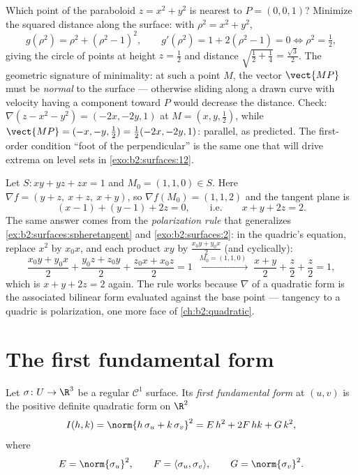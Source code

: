 \begin{example}\label{ex:b2:surfaces:closest}
Which point of the paraboloid $z = x^2 + y^2$ is nearest to
$P = (0, 0, 1)$? Minimize the squared distance along the
surface: with $\rho^2 = x^2 + y^2$,
\[
g(\rho^2) = \rho^2 + (\rho^2 - 1)^2,
\qquad
g'(\rho^2) = 1 + 2(\rho^2 - 1) = 0
\iff \rho^2 = \tfrac12 ,
\]
giving the circle of points at height $z = \frac12$ and
distance $\sqrt{\tfrac12 + \tfrac14} = \frac{\sqrt3}2$. The
geometric signature of minimality: at such a point $M$, the
vector $\vect{MP}$ must be \emph{normal} to the surface ---
otherwise sliding along a drawn curve with velocity having a
component toward $P$ would decrease the distance. Check:
$\nabla(z - x^2 - y^2) = (-2x, -2y, 1)$ at $M = (x, y,
\tfrac12)$, while $\vect{MP} = (-x, -y, \tfrac12) =
\tfrac12(-2x, -2y, 1)$: parallel, as predicted. The
first-order condition ``foot of the perpendicular'' is the
same one that will drive extrema on level sets in
\cref{exo:b2:surfaces:12}.
\end{example}

\begin{example}\label{ex:b2:surfaces:polarization}
Let $S : xy + yz + zx = 1$ and $M_0 = (1, 1, 0) \in S$. Here
$\nabla f = (y + z,\ x + z,\ x + y)$, so $\nabla f(M_0) = (1,
1, 2)$ and the tangent plane is
\[
(x - 1) + (y - 1) + 2z = 0,
\qquad\text{i.e.}\qquad x + y + 2z = 2 .
\]
The same answer comes from the \emph{polarization rule} that
generalizes \cref{ex:b2:surfaces:spheretangent} and
\cref{exo:b2:surfaces:2}: in the quadric's equation, replace
$x^2$ by $x_0x$, and each product $xy$ by $\frac{x_0y +
y_0x}2$ (and cyclically):
\[
\frac{x_0y + y_0x}2 + \frac{y_0z + z_0y}2 + \frac{z_0x +
x_0z}2 = 1
\;\xrightarrow{\ M_0 = (1,1,0)\ }\;
\frac{x + y}2 + \frac z2 + \frac z2 = 1 ,
\]
which is $x + y + 2z = 2$ again. The rule works because
$\nabla$ of a quadratic form is the associated bilinear form
evaluated against the base point --- tangency to a quadric is
polarization, one more face of \cref{ch:b2:quadratic}.
\end{example}

\section{The first fundamental form}

\begin{definition}\label{def:b2:surfaces:fff}
Let $\sigma \colon U \to \R^3$ be a regular $\mathcal{C}^1$
surface. Its \emph{first fundamental form} at $(u,v)$ is the
positive definite quadratic form on $\R^2$
\[
I(h, k) = \norm{h\,\sigma_u + k\,\sigma_v}^2
= E\,h^2 + 2F\,hk + G\,k^2,
\]
where
\[
E = \norm{\sigma_u}^2,
\qquad
F = \langle \sigma_u, \sigma_v\rangle,
\qquad
G = \norm{\sigma_v}^2 .
\]
\end{definition}

